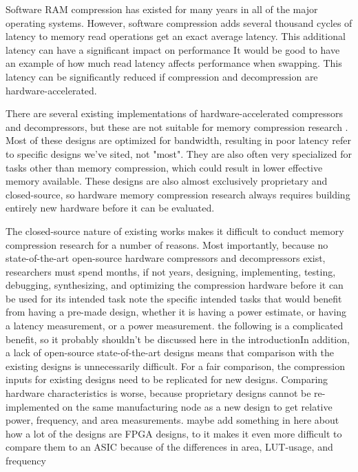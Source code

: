 \documentclass[doublespace,nopageskip]{VTthesis}
\begin{document}
Software RAM compression has existed for many years in all of the major operating systems. However, software compression adds several thousand cycles of latency to memory read operations{\color{red} get an exact average latency}. This additional latency can have a significant impact on performance {\color{red} It would be good to have an example of how much read latency affects performance when swapping}. This latency can be significantly reduced if compression and decompression are hardware-accelerated.

There are several existing implementations of hardware-accelerated compressors and decompressors, but these are not suitable for memory compression research \cite{ibm,microsoft}. Most of these designs are optimized for bandwidth, resulting in poor latency {\color{red} refer to specific designs we've sited, not "most"}. They are also often very specialized for tasks other than memory compression, which could result in lower effective memory available. These designs are also almost exclusively proprietary and closed-source, so hardware memory compression research always requires building entirely new hardware before it can be evaluated.

The closed-source nature of existing works makes it difficult to conduct memory compression research for a number of reasons. Most importantly, because no state-of-the-art open-source hardware compressors and decompressors exist, researchers must spend months, if not years, designing, implementing, testing, debugging, synthesizing, and optimizing the compression hardware before it can be used for its intended task {\color{red} note the specific intended tasks that would benefit from having a pre-made design, whether it is having a power estimate, or having a latency measurement, or a power measurement}. {\color{red} the following is a complicated benefit, so it probably shouldn't be discussed here in the introduction}{\color{orange}In addition, a lack of open-source state-of-the-art designs means that comparison with the existing designs is unnecessarily difficult. For a fair comparison, the compression inputs for existing designs need to be replicated for new designs. Comparing hardware characteristics is worse, because proprietary designs cannot be re-implemented on the same manufacturing node as a new design to get relative power, frequency, and area measurements.}{\color{yellow} maybe add something in here about how a lot of the designs are FPGA designs, to it makes it even more difficult to compare them to an ASIC because of the differences in area, LUT-usage, and frequency}
\end{document}
